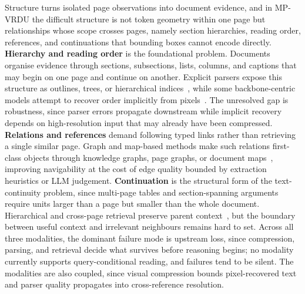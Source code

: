 \documentclass[11pt]{article}
\begin{document}
Structure turns isolated page observations into document evidence, and in MP-VRDU the difficult structure is not token geometry within one page but relationships whose scope crosses pages, namely section hierarchies, reading order, references, and continuations that bounding boxes cannot encode directly. \textbf{Hierarchy and reading order} is the foundational problem. Documents organise evidence through sections, subsections, lists, columns, and captions that may begin on one page and continue on another. Explicit parsers expose this structure as outlines, trees, or hierarchical indices~\cite{shin2025multidocfusion,sun2025docagent}, while some backbone-centric models attempt to recover order implicitly from pixels~\cite{yu2024texthawk2}. The unresolved gap is robustness, since parser errors propagate downstream while implicit recovery depends on high-resolution input that may already have been compressed. \textbf{Relations and references} demand following typed links rather than retrieving a single similar page. Graph and map-based methods make such relations first-class objects through knowledge graphs, page graphs, or document maps~\cite{wang2024knowledge,wu2025molorag,fu2026dmap}, improving navigability at the cost of edge quality bounded by extraction heuristics or LLM judgement. \textbf{Continuation} is the structural form of the text-continuity problem, since multi-page tables and section-spanning arguments require units larger than a page but smaller than the whole document. Hierarchical and cross-page retrieval preserve parent context~\cite{gong2025mhier,qian2026accurate}, but the boundary between useful context and irrelevant neighbours remains hard to set. Across all three modalities, the dominant failure mode is upstream loss, since compression, parsing, and retrieval decide what survives before reasoning begins; no modality currently supports query-conditional reading, and failures tend to be silent. The modalities are also coupled, since visual compression bounds pixel-recovered text and parser quality propagates into cross-reference resolution.

\end{document}
